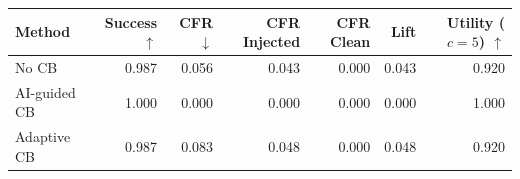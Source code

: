 \begin{tabular}{lrrrrrr}
\toprule
Method & Success $\uparrow$ & CFR $\downarrow$ & CFR Injected & CFR Clean & Lift & Utility ($c=5$) $\uparrow$ \\
\midrule
No CB & 0.987 & 0.056 & 0.043 & 0.000 & 0.043 & 0.920 \\
AI-guided CB & 1.000 & 0.000 & 0.000 & 0.000 & 0.000 & 1.000 \\
Adaptive CB & 0.987 & 0.083 & 0.048 & 0.000 & 0.048 & 0.920 \\
\bottomrule
\end{tabular}
